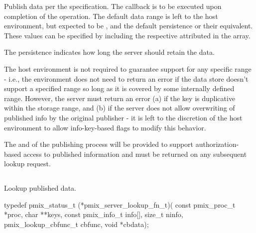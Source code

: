 \optattrend

\descr

Publish data per the  specification.
The callback is to be executed upon completion of the operation.
The default data range is left to the host environment, but expected to be , and the default persistence  or their equivalent.
These values can be specified by including the respective attributed in the  array.

The persistence indicates how long the server should retain the data.

\advicermstart
The host environment is not required to guarantee support for any specific range - i.e., the environment does not need to return an error if the data store doesn't support a specified range so long as it is covered by some internally defined range.
However, the server must return an error (a) if the key is duplicative within the storage range, and (b) if the server does not allow overwriting of published info by the original publisher - it is left to the discretion of the host environment to allow info-key-based flags to modify this behavior.

The  and  of the publishing process will be provided to support authorization-based access to published information and must be returned on any subsequent lookup request.
\advicermend

\subsection{}

\summary

Lookup published data.

\format

\cspecificstart
\begin{codepar}
typedef pmix_status_t (*pmix_server_lookup_fn_t)(
                             const pmix_proc_t *proc,
                             char **keys,
                             const pmix_info_t info[],
                             size_t ninfo,
                             pmix_lookup_cbfunc_t cbfunc,
                             void *cbdata);
\end{codepar}
\cspecificend

\begin{arglist}
\end{arglist}

